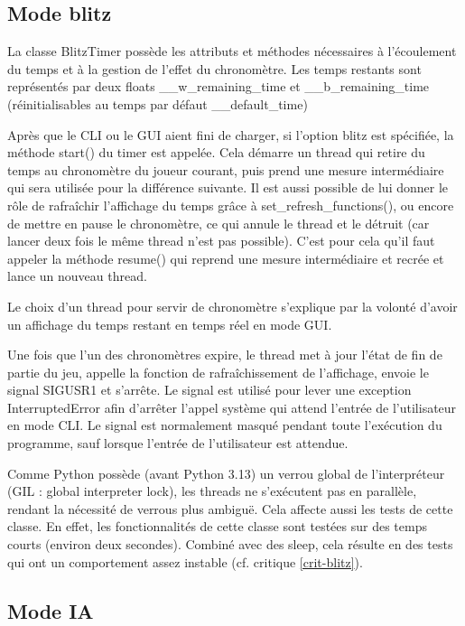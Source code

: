 \documentclass[12pt]{article}
\begin{document}
\subsection{Mode blitz}

La classe BlitzTimer possède les attributs et méthodes nécessaires à l’écoulement du temps et à la gestion de l’effet du chronomètre. Les temps restants sont représentés par deux floats \_\_w\_remaining\_time et \_\_b\_remaining\_time (réinitialisables au temps par défaut \_\_default\_time)

\bigskip
Après que le CLI ou le GUI aient fini de charger, si l’option blitz est spécifiée, la méthode start() du timer est appelée. Cela démarre un thread qui retire du temps au chronomètre du joueur courant, puis prend une mesure intermédiaire qui sera utilisée pour la différence suivante. Il est aussi possible de lui donner le rôle de rafraîchir l’affichage du temps grâce à set\_refresh\_functions(), ou encore de mettre en pause le chronomètre, ce qui annule le thread et le détruit (car lancer deux fois le même thread n’est pas possible). C’est pour cela qu’il faut appeler la méthode resume() qui reprend une mesure intermédiaire et recrée et lance un nouveau thread. 

\bigskip
Le choix d’un thread pour servir de chronomètre s’explique par la volonté d’avoir un affichage du temps restant en temps réel en mode GUI.

\bigskip
Une fois que l’un des chronomètres expire, le thread met à jour l’état de fin de partie du jeu, appelle la fonction de rafraîchissement de l’affichage, envoie le signal SIGUSR1 et s’arrête. Le signal est utilisé pour lever une exception InterruptedError afin d’arrêter l’appel système qui attend l’entrée de l’utilisateur en mode CLI. Le signal est normalement masqué pendant toute l’exécution du programme, sauf lorsque l’entrée de l’utilisateur est attendue.

\bigskip
Comme Python possède (avant Python 3.13) un verrou global de l’interpréteur (GIL : global interpreter lock), les threads ne s’exécutent pas en parallèle, rendant la nécessité de verrous plus ambiguë. Cela affecte aussi les tests de cette classe. En effet, les fonctionnalités de cette classe sont testées sur des temps courts (environ deux secondes). Combiné avec des sleep, cela résulte en des tests qui ont un comportement assez instable (cf. critique \ref{crit-blitz}).

\subsection{Mode IA}
\end{document}

